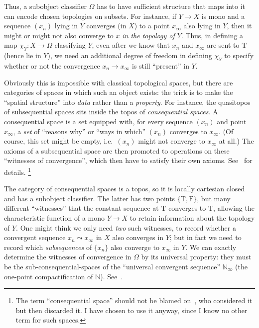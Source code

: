 \documentclass[10pt]{article}
\def\oo{\ensuremath{\infty}}
\def\N{\mathbb{N}}
\def\true{\mathrm{T}}
\def\false{\mathrm{F}}
\numberwithin{equation}{section}
\begin{document}
Thus, a subobject classifier $\Omega$ has to have sufficient structure that maps into it can encode chosen topologies on subsets.
For instance, if $Y\to X$ is mono and a sequence $(x_n)$ lying in $Y$ converges (in $X$) to a point $x_\oo$ also lying in $Y$, then it might or might not also converge to $x$ \emph{in the topology of $Y$}.
Thus, in defining a map $\chi_Y: X\to \Omega$ classifying $Y$, even after we know that $x_n$ and $x_\oo$ are sent to $\true$ (hence lie in $Y$), we need an additional degree of freedom in defining $\chi_Y$ %
to specify whether or not the convergence $x_n \to x_\oo$ is still ``present'' in $Y$.

Obviously this is impossible with classical topological spaces, %
but there are categories of spaces in which such an object exists:
the trick is to make the ``spatial structure'' into \emph{data} rather than a \emph{property}.
For instance, the quasitopos of subsequential spaces sits inside the topos of \emph{consequential spaces}.
A consequential space is a set equipped with, for every sequence $(x_n)$ and point $x_\oo$, a \emph{set} of ``reasons why'' or ``ways in which'' $(x_n)$ converges to $x_\oo$.
(Of course, this set might be empty, i.e.\ $(x_n)$ might not converge to $x_\oo$ at all.)
The axioms of a subsequential space are then promoted to operations on these ``witnesses of convergence'', which then have to satisfy their own axioms.
See~\cite{ptj:topological-topos} for details.%
\footnote{The term ``consequential space'' should not be blamed on~\cite{ptj:topological-topos}, who considered it but then discarded it.
  I have chosen to use it anyway, since I know no other term for such spaces.}

The category of consequential spaces is a topos, so it is locally cartesian closed and has a subobject classifier.
The latter has two points $\{\true,\false\}$, but many different ``witnesses'' that the constant sequence at $\true$ converges to $\true$, allowing the characteristic function of a mono $Y\to X$ to retain information about the topology of $Y$.
One might think we only need \emph{two} such witnesses, to record whether a convergent sequence $x_n\leadsto x_\oo$ in $X$ also converges in $Y$; but in fact we need to record which \emph{subsequences} of $\{x_n\}$ also converge to $x_\oo$ in $Y$.
We can exactly determine the witnesses of convergence in $\Omega$ by its universal property: they must be the sub-consequential-spaces of the ``universal convergent sequence'' $\N_\oo$ (the one-point compactification of $\N$).
See~\cite[Corollary 4.2]{ptj:topological-topos}.
\end{document}

